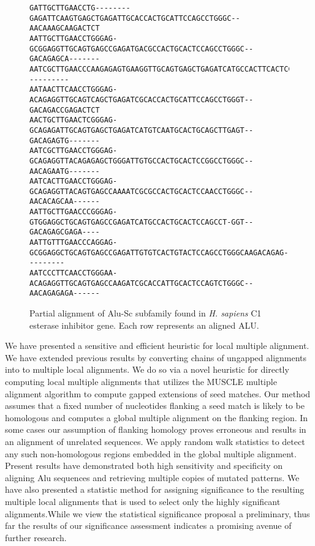 \documentclass{ws-procs9x6}
\begin{document}
\begin{figure}[t]
\scriptsize
\begin{verbatim}
GATTGCTTGAACCTG--------GAGATTCAAGTGAGCTGAGATTGCACCACTGCATTCCAGCCTGGGC--AACAAAGCAAGACTCT
AATTGCTTGAACCTGGGAG-GCGGAGGTTGCAGTGAGCCGAGATGACGCCACTGCACTCCAGCCTGGGC--GACAGAGCA-------
AATCGCTTGAACCCAAGAGAGTGAAGGTTGCAGTGAGCTGAGATCATGCCACTTCACTCCAGCCTGAGTGAAACAGC----------
AATAACTTCAACCTGGGAG-ACAGAGGTTGCAGTCAGCTGAGATCGCACCACTGCATTCCAGCCTGGGT--GACAGACCGAGACTCT
AACTGCTTGAACTCGGGAG-GCAGAGATTGCAGTGAGCTGAGATCATGTCAATGCACTGCAGCTTGAGT--GACAGAGTG-------
AATCGCTTGAACCTGGGAG-GCAGAGGTTACAGAGAGCTGGGATTGTGCCACTGCACTCCGGCCTGGGC--AACAGAATG-------
AATCACTTGAACCTGGGAG-GCAGAGGTTACAGTGAGCCAAAATCGCGCCACTGCACTCCAACCTGGGC--AACACAGCAA------
AATTGCTTGAACCCGGGAG-GTGGAGGCTGCAGTGAGCCGAGATCATGCCACTGCACTCCAGCCT-GGT--GACAGAGCGAGA----
AATTGTTTGAACCCAGGAG-GCGGAGGCTGCAGTGAGCCGAGATTGTGTCACTGTACTCCAGCCTGGGCAAGACAGAG---------
AATCCCTTCAACCTGGGAA-ACAGAGGTTGCAGTGAGCCAAGATCGCACCATTGCACTCCAGTCTGGGC--AACAGAGAGA------
\end{verbatim}
\normalsize
\caption{Partial alignment of Alu-Sc subfamily found in \emph{H. sapiens} C1 esterase inhibitor gene. Each row represents an aligned ALU.}
\label{fig-align}
\end{figure}
We have presented a sensitive and efficient heuristic for local multiple alignment.
We have extended previous results by converting chains of ungapped alignments into to multiple local alignments. We do so via a novel heuristic for directly computing local multiple alignments that utilizes the MUSCLE multiple alignment algorithm to compute gapped extensions of seed matches.  Our method assumes that a fixed number of nucleotides flanking a seed match is likely to be homologous and computes a global multiple alignment on the flanking region.  In some cases our assumption of flanking homology proves erroneous and results in an alignment of unrelated sequences.  We apply random walk statistics to detect any such non-homologous regions embedded in the global multiple alignment.
Present results have demonstrated both high sensitivity and specificity on aligning Alu
sequences and retrieving multiple copies of mutated patterns. We have also presented a statistic method for assigning significance to the resulting multiple local alignments that is used to select only the highly significant alignments.While we view the statistical significance proposal a preliminary, thus far the results of our significance assessment indicates a promising avenue of further research.
\end{document}
